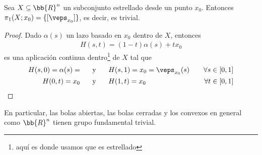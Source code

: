 \begin{ejemplo}
    Sea $X\subseteq \bb{R}^n$ un subconjunto estrellado desde un punto $x_0$. Entonces $\pi_1(X;x_0) = \{[\veps_{x_0}]\}$, es decir, es trivial.

    \begin{proof}
        Dado $\alpha(s)$ un lazo basado en $x_0$ dentro de $X$, entonces 
        \begin{gather*}
            H(s,t) = (1-t)\alpha(s)+tx_0
        \end{gather*}
        es una aplicación continua dentro\footnote{aquí es donde usamos que es estrellado} de $X$ tal que 
        \begin{align*}
            H(s,0) = \alpha(s) = \hspace{0.5cm} &\text{ y } \hspace{0.5cm} H(s,1) = x_0 = \veps_{x_0}(s) \ \ \ &\forall s\in [0,1]\\
            H(0,t) = x_0  \hspace{0.5cm} &\text{ y } \hspace{0.5cm} H(1,t) = x_0\ \ \ &\forall t \in [0,1]
        \end{align*}
    \end{proof}
    En particular, las bolas abiertas, las bolas cerradas y los convexos en general como $\bb{R}^n$ tienen grupo fundamental trivial.
\end{ejemplo}

